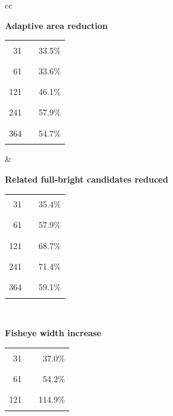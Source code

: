 \begin{center}
\begin{figure}[htbp]
\centering
\begin{tabular}{cc}
\begin{minipage}[t]{0.46\textwidth}
\centering
\textbf{Adaptive area reduction}\\[-0.2em]
\begin{tabular}{@{}r l r@{}}
31 & \textcolor{blue!70!black}{\rule{0.1155\textwidth}{1.1ex}} & 33.5\% \\
61 & \textcolor{blue!70!black}{\rule{0.1159\textwidth}{1.1ex}} & 33.6\% \\
121 & \textcolor{blue!70!black}{\rule{0.1591\textwidth}{1.1ex}} & 46.1\% \\
241 & \textcolor{blue!70!black}{\rule{0.2000\textwidth}{1.1ex}} & 57.9\% \\
364 & \textcolor{blue!70!black}{\rule{0.1887\textwidth}{1.1ex}} & 54.7\% \\
\end{tabular}
\end{minipage}
&
\begin{minipage}[t]{0.46\textwidth}
\centering
\textbf{Related full-bright candidates reduced}\\[-0.2em]
\begin{tabular}{@{}r l r@{}}
31 & \textcolor{blue!70!black}{\rule{0.0992\textwidth}{1.1ex}} & 35.4\% \\
61 & \textcolor{blue!70!black}{\rule{0.1623\textwidth}{1.1ex}} & 57.9\% \\
121 & \textcolor{blue!70!black}{\rule{0.1926\textwidth}{1.1ex}} & 68.7\% \\
241 & \textcolor{blue!70!black}{\rule{0.2000\textwidth}{1.1ex}} & 71.4\% \\
364 & \textcolor{blue!70!black}{\rule{0.1656\textwidth}{1.1ex}} & 59.1\% \\
\end{tabular}
\end{minipage} \\[1.2em]
\begin{minipage}[t]{0.46\textwidth}
\centering
\textbf{Fisheye width increase}\\[-0.2em]
\begin{tabular}{@{}r l r@{}}
31 & \textcolor{blue!70!black}{\rule{0.0247\textwidth}{1.1ex}} & 37.0\% \\
61 & \textcolor{blue!70!black}{\rule{0.0361\textwidth}{1.1ex}} & 54.2\% \\
121 & \textcolor{blue!70!black}{\rule{0.0765\textwidth}{1.1ex}} & 114.9\% \\

\end{tabular}
\end{minipage}
\end{tabular}
\end{figure}
\end{center}
